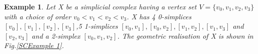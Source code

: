 \documentclass{article}
\newtheorem{definition}[theorem]{Definition}
\newtheorem{example}[theorem]{Example}
\begin{document}
\begin{example}
Let X be a simplicial complex having a vertex set $V =\{v_0, v_1, v_2, v_3\}$ with a choice of order $v_0 < v_1 < v_2 < v_3$. X has 4 0-simplices $[v_0], [v_1], [v_2], [v_3]$,5 1-simplices $[v_0,v_1],[v_0,v_2],[v_1,v_2],[v_1,v_3]$ and $[v_2,v_3]$ and a 2-simplex $[v_0, v_1, v_2]$. The geometric realisation of X is shown in Fig.\ref{SCExample 1}.
\end{example}
\end{document}
